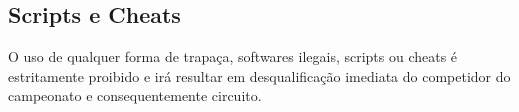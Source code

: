 \subsection{Scripts e Cheats}

O uso de qualquer forma de trapaça, softwares ilegais, scripts ou cheats é estritamente proibido e irá resultar em desqualificação imediata do competidor do campeonato e consequentemente circuito.